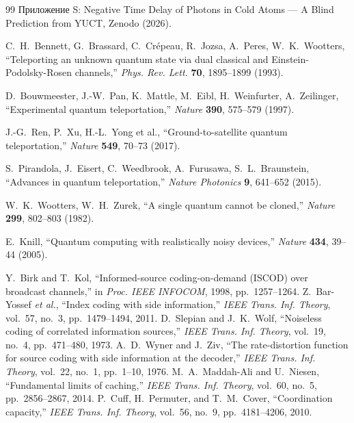 \documentclass[12pt,a4paper]{article}
\theoremstyle{remark}
\begin{document}
\begin{thebibliography}{99}
		Приложение S: Negative Time Delay of Photons in Cold Atoms — A Blind Prediction from YUCT, Zenodo (2026).
		
		 C.~H.~Bennett, G.~Brassard, C.~Crépeau, R.~Jozsa, A.~Peres, W.~K.~Wootters,
		``Teleporting an unknown quantum state via dual classical and Einstein-Podolsky-Rosen channels,''
		\emph{Phys. Rev. Lett.} \textbf{70}, 1895--1899 (1993).
		
		 D.~Bouwmeester, J.-W.~Pan, K.~Mattle, M.~Eibl, H.~Weinfurter, A.~Zeilinger,
		``Experimental quantum teleportation,''
		\emph{Nature} \textbf{390}, 575--579 (1997).
		
		 J.-G.~Ren, P.~Xu, H.-L.~Yong et al.,
		``Ground-to-satellite quantum teleportation,''
		\emph{Nature} \textbf{549}, 70--73 (2017).
		
		 S.~Pirandola, J.~Eisert, C.~Weedbrook, A.~Furusawa, S.~L.~Braunstein,
		``Advances in quantum teleportation,''
		\emph{Nature Photonics} \textbf{9}, 641--652 (2015).
		
		 W.~K.~Wootters, W.~H.~Zurek,
		``A single quantum cannot be cloned,''
		\emph{Nature} \textbf{299}, 802--803 (1982).
		
		 E.~Knill,
		``Quantum computing with realistically noisy devices,''
		\emph{Nature} \textbf{434}, 39--44 (2005).
		
		 Y.~Birk and T.~Kol, ``Informed-source coding-on-demand (ISCOD) over broadcast channels,'' in \emph{Proc. IEEE INFOCOM}, 1998, pp.~1257--1264.
		 Z.~Bar-Yossef \emph{et al.}, ``Index coding with side information,'' \emph{IEEE Trans. Inf. Theory}, vol.~57, no.~3, pp.~1479--1494, 2011.
		 D.~Slepian and J.~K.~Wolf, ``Noiseless coding of correlated information sources,'' \emph{IEEE Trans. Inf. Theory}, vol.~19, no.~4, pp.~471--480, 1973.
		 A.~D.~Wyner and J.~Ziv, ``The rate-distortion function for source coding with side information at the decoder,'' \emph{IEEE Trans. Inf. Theory}, vol.~22, no.~1, pp.~1--10, 1976.
		 M.~A.~Maddah-Ali and U.~Niesen, ``Fundamental limits of caching,'' \emph{IEEE Trans. Inf. Theory}, vol.~60, no.~5, pp.~2856--2867, 2014.
		 P.~Cuff, H.~Permuter, and T.~M.~Cover, ``Coordination capacity,'' \emph{IEEE Trans. Inf. Theory}, vol.~56, no.~9, pp.~4181--4206, 2010.
		
	\end{thebibliography}
	
\end{document}
